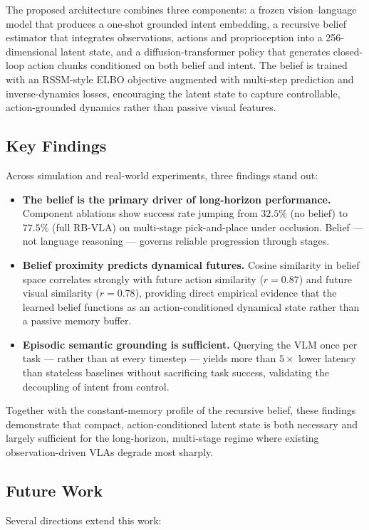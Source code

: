 \documentclass[12pt]{article}
\begin{document}
The proposed architecture combines three components: a frozen vision--language model that produces a one-shot grounded intent embedding, a recursive belief estimator that integrates observations, actions and proprioception into a 256-dimensional latent state, and a diffusion-transformer policy that generates closed-loop action chunks conditioned on both belief and intent. The belief is trained with an RSSM-style ELBO objective augmented with multi-step prediction and inverse-dynamics losses, encouraging the latent state to capture controllable, action-grounded dynamics rather than passive visual features.

\subsection{Key Findings}
Across simulation and real-world experiments, three findings stand out:

\begin{itemize}
    \item \textbf{The belief is the primary driver of long-horizon performance.} Component ablations show success rate jumping from $32.5\%$ (no belief) to $77.5\%$ (full RB-VLA) on multi-stage pick-and-place under occlusion. Belief --- not language reasoning --- governs reliable progression through stages.
    \item \textbf{Belief proximity predicts dynamical futures.} Cosine similarity in belief space correlates strongly with future action similarity ($r = 0.87$) and future visual similarity ($r = 0.78$), providing direct empirical evidence that the learned belief functions as an action-conditioned dynamical state rather than a passive memory buffer.
    \item \textbf{Episodic semantic grounding is sufficient.} Querying the VLM once per task --- rather than at every timestep --- yields more than $5\times$ lower latency than stateless baselines without sacrificing task success, validating the decoupling of intent from control.
\end{itemize}

Together with the constant-memory profile of the recursive belief, these findings demonstrate that compact, action-conditioned latent state is both necessary and largely sufficient for the long-horizon, multi-stage regime where existing observation-driven VLAs degrade most sharply.

\subsection{Future Work}
Several directions extend this work:
\end{document}

